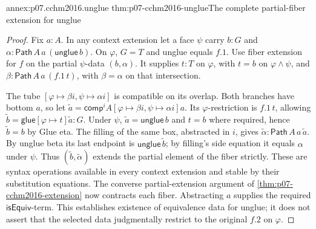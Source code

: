 \begin{annexitem}{annex:p07.cchm2016.unglue}
 {thm:p07-cchm2016-unglue}{The complete partial-fiber extension for unglue}
\begin{proof}
Fix \(a:A\).  In any context extension let a face \(\psi\) carry
\(b:G\) and
\(\alpha:\mathsf{Path}\,A\,a\,(\mathsf{unglue}\,b)\).
On \(\varphi\), \(G=T\) and unglue equals \(f.1\).
Use fiber extension for \(f\) on the partial \(\psi\)-data
\((b,\alpha)\).  It supplies \(t:T\) on \(\varphi\), with \(t=b\)
on \(\varphi\wedge\psi\), and
\(\beta:\mathsf{Path}\,A\,a\,(f.1\,t)\), with
\(\beta=\alpha\) on that intersection.

The tube \([\varphi\mapsto\beta i,\psi\mapsto\alpha i]\) is compatible
on its overlap.  Both branches have bottom \(a\), so let
\(\widetilde a=\mathsf{comp}^{i}A
[\varphi\mapsto\beta i,\psi\mapsto\alpha i]a\).
Its \(\varphi\)-restriction is \(f.1\,t\), allowing
\(\widetilde b=\mathsf{glue}[\varphi\mapsto t]\widetilde a:G\).
Under \(\psi\), \(\widetilde a=\mathsf{unglue}\,b\) and \(t=b\)
where required, hence \(\widetilde b=b\) by Glue eta.
The filling of the same box, abstracted in \(i\), gives
\(\widetilde\alpha:\mathsf{Path}\,A\,a\,\widetilde a\).
By unglue beta its last endpoint is
\(\mathsf{unglue}\,\widetilde b\); by filling's side equation it
equals \(\alpha\) under \(\psi\).
Thus \((\widetilde b,\widetilde\alpha)\) extends the partial element
of the fiber strictly.
These are syntax operations available in every context extension
and stable by their substitution equations.
The converse partial-extension argument of
\ref{thm:p07-cchm2016-extension} now contracts each fiber.
Abstracting \(a\) supplies the required \(\mathsf{isEquiv}\)-term.
This establishes existence of equivalence data for unglue; it does
not assert that the selected data judgmentally restrict to the
original \(f.2\) on \(\varphi\).
\end{proof}
\end{annexitem}

